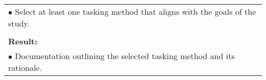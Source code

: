 \begin{table}[!h]
\begin{center}
\begin{tabular}{|p{35mm}||p{55mm}|p{50mm}||p{40mm}|}
      \multicolumn{4}{|p{150mm}|}{$\bullet$ Select at least one tasking method that aligns with the goals of the study.} \\
      \multicolumn{4}{|p{150mm}|}{}                                                                                                                                                                           \\
      \multicolumn{4}{|p{150mm}|}{\textbf{Result:}}                                                                                                                                                       \\
      \multicolumn{4}{|p{150mm}|}{$\bullet$ Documentation outlining the selected tasking method and its rationale.}                                                                                                                          \\
      \hline
    \end{tabular}
  \end{center}
\end{table}

\clearpage


